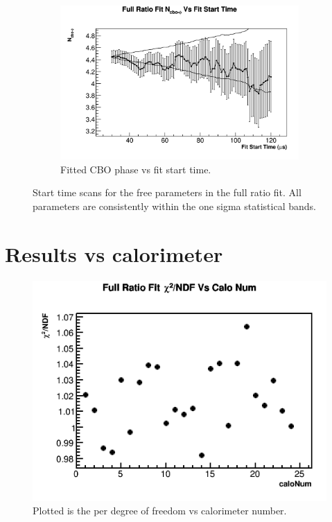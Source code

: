 \begin{figure}[]
\begin{subfigure}[t]{0.45\textwidth}
		\includegraphics[width=\textwidth]{RatioCBO_N_cbo-phi_FS_Canv}
	    \caption{Fitted CBO phase vs fit start time.}
    \end{subfigure}%
\caption[FitStartScans]{Start time scans for the free parameters in the full ratio fit. All parameters are consistently within the one sigma statistical bands.}
\label{fig:FitStartScans}
\end{figure}



\section{Results vs calorimeter}

\begin{figure}[H]
	\centering
	\includegraphics[width=.7\textwidth]{RatioCBOFit_Chi2NDF_Vs_Calo_Canv}
    \caption[RatioCBOFit_Chi2NDF_Vs_Calo_Canv]{Plotted is the \chisq per degree of freedom vs calorimeter number.}
    \label{fig:RatioCBOFit_Chi2NDF_Vs_Calo_Canv}
\end{figure}


